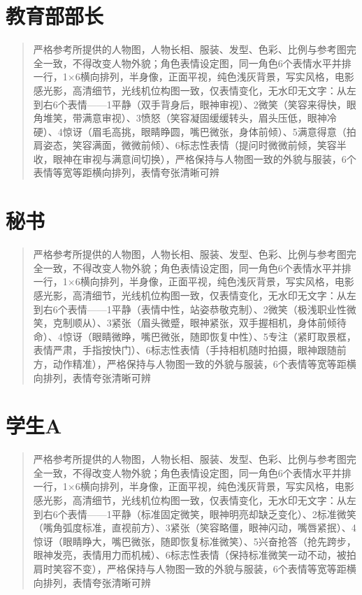 \documentclass[11pt, a4paper]{article}
\begin{document}
	\section{教育部部长}
	
	\begin{quote}
		\small
		严格参考所提供的人物图，人物长相、服装、发型、色彩、比例与参考图完全一致，不得改变人物外貌；角色表情设定图，同一角色6个表情水平并排一行，1×6横向排列，半身像，正面平视，纯色浅灰背景，写实风格，电影感光影，高清细节，光线机位构图一致，仅表情变化，无水印无文字：从左到右6个表情——1平静（双手背身后，眼神审视）、2微笑（笑容来得快，眼角堆笑，带满意审视）、3愤怒（笑容凝固缓缓转头，眉头压低，眼神冷硬）、4惊讶（眉毛高挑，眼睛睁圆，嘴巴微张，身体前倾）、5满意得意（拍肩姿态，笑容满面，微微前倾）、6标志性表情（提问时微微前倾，笑容半收，眼神在审视与满意间切换），严格保持与人物图一致的外貌与服装，6个表情等宽等距横向排列，表情夸张清晰可辨
	\end{quote}
	
	\section{秘书}
	
	\begin{quote}
		\small
		严格参考所提供的人物图，人物长相、服装、发型、色彩、比例与参考图完全一致，不得改变人物外貌；角色表情设定图，同一角色6个表情水平并排一行，1×6横向排列，半身像，正面平视，纯色浅灰背景，写实风格，电影感光影，高清细节，光线机位构图一致，仅表情变化，无水印无文字：从左到右6个表情——1平静（表情中性，站姿恭敬克制）、2微笑（极浅职业性微笑，克制顺从）、3紧张（眉头微蹙，眼神紧张，双手握相机，身体前倾待命）、4惊讶（眼睛微睁，嘴巴微张，随即恢复中性）、5专注（紧盯取景框，表情严肃，手指按快门）、6标志性表情（手持相机随时拍摄，眼神跟随前方，动作精准），严格保持与人物图一致的外貌与服装，6个表情等宽等距横向排列，表情夸张清晰可辨
	\end{quote}
	
	\section{学生A}
	
	\begin{quote}
		\small
		严格参考所提供的人物图，人物长相、服装、发型、色彩、比例与参考图完全一致，不得改变人物外貌；角色表情设定图，同一角色6个表情水平并排一行，1×6横向排列，半身像，正面平视，纯色浅灰背景，写实风格，电影感光影，高清细节，光线机位构图一致，仅表情变化，无水印无文字：从左到右6个表情——1平静（标准固定微笑，眼神明亮却缺乏变化）、2标准微笑（嘴角弧度标准，直视前方）、3紧张（笑容略僵，眼神闪动，嘴唇紧抿）、4惊讶（眼睛睁大，嘴巴微张，随即恢复标准微笑）、5兴奋抢答（抢先跨步，眼神发亮，表情用力而机械）、6标志性表情（保持标准微笑一动不动，被拍肩时笑容不变），严格保持与人物图一致的外貌与服装，6个表情等宽等距横向排列，表情夸张清晰可辨
	\end{quote}
	
\end{document}
